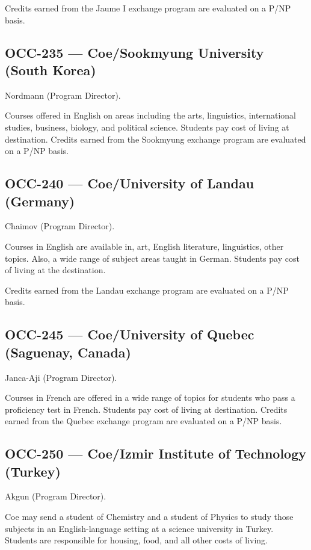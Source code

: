 \documentclass[
  letterpaper,
]{scrbook}
\begin{document}
Credits earned from the Jaume I exchange program are evaluated on a P/NP
basis.

\subsection{OCC-235 --- Coe/Sookmyung University (South
Korea)}\label{occ-235-coesookmyung-university-south-korea}

Nordmann (Program Director).

Courses offered in English on areas including the arts, linguistics,
international studies, business, biology, and political science.
Students pay cost of living at destination. Credits earned from the
Sookmyung exchange program are evaluated on a P/NP basis.

\subsection{OCC-240 --- Coe/University of Landau
(Germany)}\label{occ-240-coeuniversity-of-landau-germany}

Chaimov (Program Director).

Courses in English are available in, art, English literature,
linguistics, other topics. Also, a wide range of subject areas taught in
German. Students pay cost of living at the destination.

Credits earned from the Landau exchange program are evaluated on a P/NP
basis.

\subsection{OCC-245 --- Coe/University of Quebec (Saguenay,
Canada)}\label{occ-245-coeuniversity-of-quebec-saguenay-canada}

Janca-Aji (Program Director).

Courses in French are offered in a wide range of topics for students who
pass a proficiency test in French. Students pay cost of living at
destination. Credits earned from the Quebec exchange program are
evaluated on a P/NP basis.

\subsection{OCC-250 --- Coe/Izmir Institute of Technology
(Turkey)}\label{occ-250-coeizmir-institute-of-technology-turkey}

Akgun (Program Director).

Coe may send a student of Chemistry and a student of Physics to study
those subjects in an English-language setting at a science university in
Turkey. Students are responsible for housing, food, and all other costs
of living.
\end{document}
